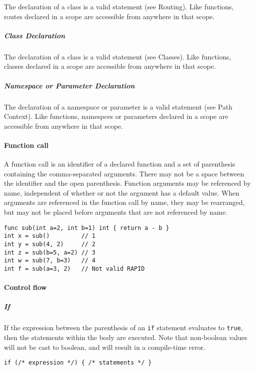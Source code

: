 The declaration of a class is a valid statement (see Routing). Like
functions, routes declared in a scope are accessible from anywhere in
that scope.

\subparagraph{Class Declaration}\label{class-declaration}

The declaration of a class is a valid statement (see Classes). Like
functions, classes declared in a scope are accessible from anywhere in
that scope.

\subparagraph{Namespace or Parameter
Declaration}\label{namespace-or-parameter-declaration}

The declaration of a namespace or parameter is a valid statement (see
Path Context). Like functions, namespces or parameters declared in a
scope are accessible from anywhere in that scope.

\paragraph{Function call}\label{function-call}

A function call is an identifier of a declared function and a set of
parenthesis containing the comma-separated arguments. There may not be a
space between the identifier and the open parenthesis. Function
arguments may be referenced by name, independent of whether or not the
argument has a default value. When arguments are referenced in the
function call by name, they may be rearranged, but may not be placed
before arguments that are not referenced by name.

\begin{verbatim}
func sub(int a=2, int b=1) int { return a - b }
int x = sub()         // 1
int y = sub(4, 2)     // 2
int z = sub(b=5, a=2) // 3
int w = sub(7, b=3)   // 4
int f = sub(a=3, 2)   // Not valid RAPID
\end{verbatim}

\paragraph{Control flow}\label{control-flow}

\subparagraph{If}\label{if}

If the expression between the parenthesis of an \texttt{if} statement
evaluates to \texttt{true}, then the statements within the body are
executed. Note that non-boolean values will not be cast to boolean, and
will result in a compile-time error.

\begin{verbatim}
if (/* expression */) { /* statements */ }
\end{verbatim}

